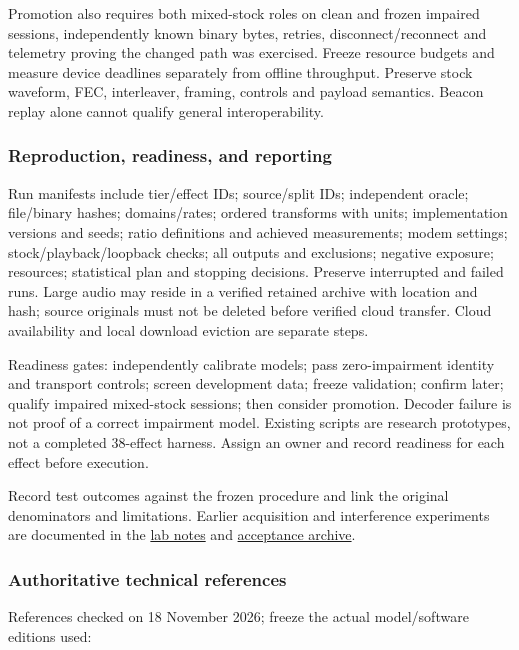 \documentclass[11pt,a4paper]{article}
\begin{document}
Promotion also requires both mixed-stock roles on clean and frozen impaired sessions, independently known binary bytes, retries, disconnect/reconnect and telemetry proving the changed path was exercised. Freeze resource budgets and measure device deadlines separately from offline throughput. Preserve stock waveform, FEC, interleaver, framing, controls and payload semantics. Beacon replay alone cannot qualify general interoperability.

\subsubsection{Reproduction, readiness, and reporting}
Run manifests include tier/effect IDs; source/split IDs; independent oracle; file/binary hashes; domains/rates; ordered transforms with units; implementation versions and seeds; ratio definitions and achieved measurements; modem settings; stock/playback/loopback checks; all outputs and exclusions; negative exposure; resources; statistical plan and stopping decisions. Preserve interrupted and failed runs. Large audio may reside in a verified retained archive with location and hash; source originals must not be deleted before verified cloud transfer. Cloud availability and local download eviction are separate steps.

Readiness gates: independently calibrate models; pass zero-impairment identity and transport controls; screen development data; freeze validation; confirm later; qualify impaired mixed-stock sessions; then consider promotion. Decoder failure is not proof of a correct impairment model. Existing  scripts are research prototypes, not a completed 38-effect harness. Assign an owner and record readiness for each effect before execution.

Record test outcomes against the frozen procedure and link the original denominators and limitations. Earlier acquisition and interference experiments are documented in the \href{../../../rust/docs/../../lab-notes/lab-notes.pdf}{lab notes} and \href{../../../rust/docs/../../tools/soft-metric-study/results/acceptance-2026-11-18/environment.json}{acceptance archive}.

\subsubsection{Authoritative technical references}
References checked on 18 November 2026; freeze the actual model/software editions used:
\end{document}
